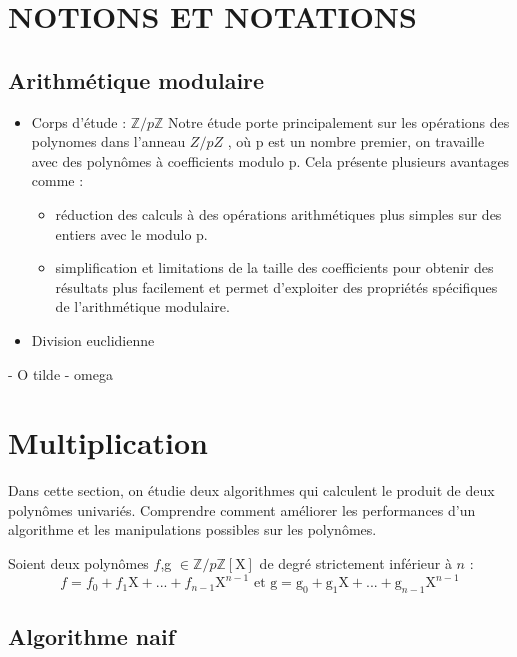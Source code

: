 \documentclass[a4paper]{article}
\begin{document}
\section{NOTIONS ET NOTATIONS}


\subsection{Arithmétique modulaire}

\begin{itemize}[label=$\star$]
 \item Corps d'étude : ${\mathbb{Z}/p \mathbb{Z}}$
Notre étude porte principalement sur les opérations des polynomes dans l'anneau $Z/pZ$ , où p est un nombre premier, on travaille avec des polynômes à coefficients modulo p. Cela présente plusieurs avantages comme :
	\begin{itemize}

  		\item réduction des calculs à des opérations arithmétiques plus simples sur des entiers avec le modulo p.
  		\item simplification et limitations de la taille des coefficients pour obtenir des résultats plus facilement et permet d'exploiter des propriétés spécifiques de l'arithmétique modulaire.
  
	\end{itemize}
	
 \item Division euclidienne

\end{itemize}

- O tilde
- omega

\section{Multiplication}

Dans cette section, on étudie deux algorithmes qui calculent le produit de deux polynômes univariés.
Comprendre comment améliorer les performances d'un algorithme et les manipulations possibles sur les polynômes.


Soient deux polynômes $f$,g $\in \mathbb{Z}/p\mathbb{Z}[\mathrm{X}]$ de degré strictement inférieur à $n$ :
\[
f=f_0+f_1\mathrm{X}+...+f_{n-1}\mathrm{X}^{n-1}\text{ et g}=\mathrm{g}_0+\mathrm{g}_1\mathrm{X}+...+\mathrm{g}_{n-1}\mathrm{X}^{n-1}
\]

\subsection{Algorithme naif}
\end{document}
